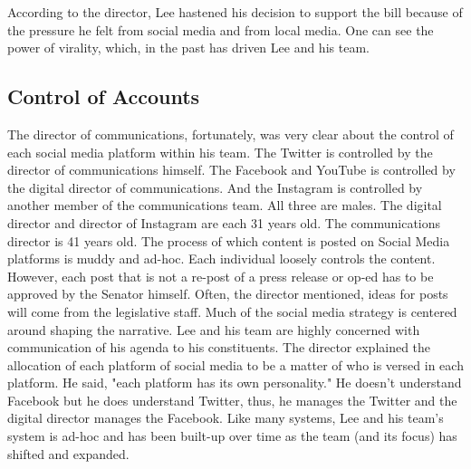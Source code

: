 \documentclass{article}
\begin{document}
\begin{flushleft}
According to the director, Lee hastened his decision to support the bill because of the pressure he felt from social media and from local media. One can see the power of virality, which, in the past has driven Lee and his team. 
\end{flushleft}

\subsection{Control of Accounts}
\begin{flushleft}
The director of communications, fortunately, was very clear about the control of each social media platform within his team. The Twitter is controlled by the director of communications himself. The Facebook and YouTube is controlled by the digital director of communications. And the Instagram is controlled by another member of the communications team. All three are males. The digital director and director of Instagram are each 31 years old. The communications director is 41 years old. The process of which content is posted on Social Media platforms is muddy and ad-hoc. Each individual loosely controls the content. However, each post that is not a re-post of a press release or op-ed has to be approved by the Senator himself. Often, the director mentioned, ideas for posts will come from the legislative staff. Much of the social media strategy is centered around shaping the narrative. Lee and his team are highly concerned with communication of his agenda to his constituents. The director explained the allocation of each platform of social media to be a matter of who is versed in each platform. He said, "each platform has its own personality." He doesn't understand Facebook but he does understand Twitter, thus, he manages the Twitter and the digital director manages the Facebook. Like many systems, Lee and his team's system is ad-hoc and has been built-up over time as the team (and its focus) has shifted and expanded. 
\end{flushleft}
\end{document}
